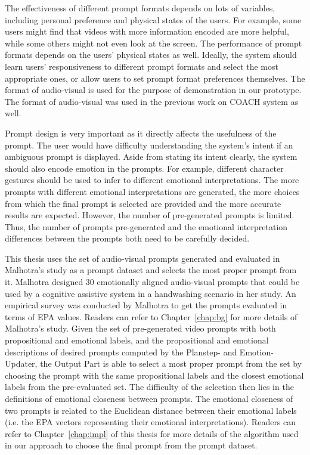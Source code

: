 The effectiveness of different prompt formats depends on lots of variables, including personal preference and physical states of the users. For example, some users might find that videos with more information encoded are more helpful, while some others might not even look at the screen. The performance of prompt formats depends on the users' physical states as well. Ideally, the system should learn users' responsiveness to different prompt formats and select the most appropriate ones, or allow users to set prompt format preferences themselves. The format of audio-visual is used for the purpose of demonstration in our prototype. The format of audio-visual was used in the previous work on COACH system as well.

Prompt design is very important as it directly affects the usefulness of the prompt. The user would have difficulty understanding the system's intent if an ambiguous prompt is displayed. Aside from stating its intent clearly, the system should also encode emotion in the prompts. For example, different character gestures should be used to infer to different emotional interpretations. The more prompts with different emotional interpretations are generated, the more choices from which the final prompt is selected are provided and the more accurate results are expected. However, the number of pre-generated prompts is limited. Thus, the number of prompts pre-generated and the emotional interpretation differences between the prompts both need to be carefully decided. 

This thesis uses the set of audio-visual prompts generated and evaluated in Malhotra's study \cite{malhotra2014} as a prompt dataset and selects the most proper prompt from it. Malhotra designed 30 emotionally aligned audio-visual prompts that could be used by a cognitive assistive system in a handwashing scenario in her study. An empirical survey was conducted by Malhotra to get the prompts evaluated in terms of EPA values. Readers can refer to Chapter~\ref{chap:bg} for more details of Malhotra's study. Given the set of pre-generated video prompts with both propositional and emotional labels, and the propositional and emotional descriptions of desired prompts computed by the Planstep- and Emotion- Updater, the Output Part is able to select a most proper prompt from the set by choosing the prompt with the same propositional labels and the closest emotional labels from the pre-evaluated set. The difficulty of the selection then lies in the definitions of emotional closeness between prompts. The emotional closeness of two prompts is related to the Euclidean distance between their emotional labels (i.e. the EPA vectors representing their emotional interpretations). Readers can refer to Chapter~\ref{chap:impl} of this thesis for more details of the algorithm used in our approach to choose the final prompt from the prompt dataset.

